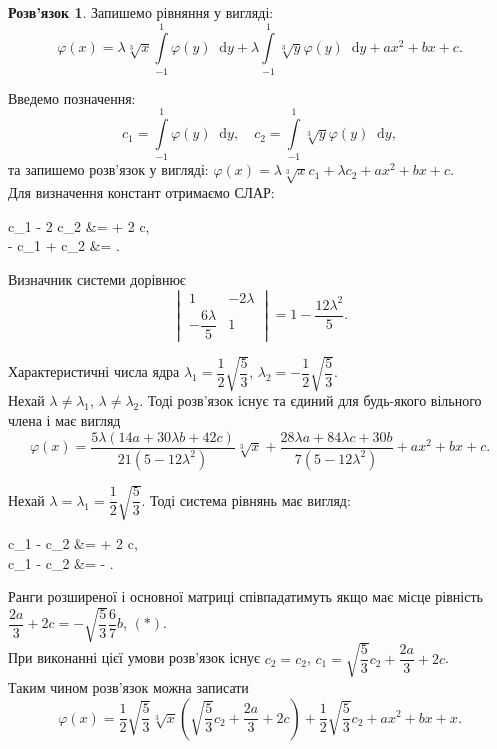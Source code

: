 \documentclass[a4paper, 12pt]{article}
\theoremstyle{definition}
\newtheorem*{solution*}{Розв'язок}
\newcommand{\Int}{\displaystyle\int\limits}
\newcommand*\diff{\mathop{}\!\mathrm{d}}
\renewcommand{\phi}{\varphi}
\newenvironment{system*}{\begin{equation*} \left\{\begin{aligned}}{\end{aligned} \right. \end{equation*}}
\begin{document}
\begin{solution*}
	Запишемо рівняння у вигляді: \[\phi(x) = \lambda \sqrt[3]{x} \Int_{-1}^1 \phi(y) \diff y + \lambda \Int_{-1}^1 \sqrt[3]{y} \phi(y) \diff y + ax^2 + bx + c. \]

	Введемо позначення: \[ c_1 = \Int_{-1}^1 \phi(y) \diff y, \quad c_2 = \Int_{-1}^1 \sqrt[3]{y} \phi(y) \diff y, \]
	та запишемо розв’язок у вигляді: $\phi(x) = \lambda \sqrt[3]{x} c_1 + \lambda c_2 + ax^2 + bx + c$. \\

	Для визначення констант отримаємо СЛАР:
	\begin{system*}
		c_1 - 2 \lambda c_2 &=  + 2 c, \\
		-  c_1 + c_2 &= .
	\end{system*}

	Визначник системи дорівнює \[\begin{vmatrix} 1 & - 2 \lambda \\ - \dfrac{6\lambda}{5} & 1 \end{vmatrix} = 1 - \dfrac{12\lambda^2}{5}.\]

	Характеристичні числа ядра $\lambda_1 = \dfrac{1}{2} \sqrt{\dfrac{5}{3}}$, $\lambda_2 = - \dfrac{1}{2} \sqrt{\dfrac{5}{3}}$. \\

	Нехай $\lambda \ne \lambda_1$, $\lambda \ne \lambda_2$. Тоді розв'язок існує та єдиний для будь-якого вільного члена і має вигляд \[ \phi(x) = \dfrac{5 \lambda (14 a + 30 \lambda b + 42 c)}{21 (5 - 12 \lambda^2)} \sqrt[3]{x} + \dfrac{28 \lambda a + 84 \lambda c + 30 b}{7(5 - 12 \lambda^2)} + ax^2 + bx + c. \]

	Нехай $\lambda = \lambda_1 = \dfrac{1}{2} \sqrt{\dfrac{5}{3}}$. Тоді система рівнянь має вигляд:
	\begin{system*}
		c_1 -  c_2 &=  + 2 c, \\
		c_1 -  c_2 &= -  \dfrac{6b}{7}.
	\end{system*}

	Ранги розширеної і основної матриці співпадатимуть якщо має місце рівність $\dfrac{2a}{3} + 2c = - \sqrt{\dfrac{5}{3}} \dfrac{6}{7} b$, $(*)$. \\

	При виконанні цієї умови розв'язок існує $c_2 = c_2$, $c_1 = \sqrt{\dfrac{5}{3}} c_2 + \dfrac{2a}{3} + 2c$. \\

	Таким чином розв'язок можна записати \[ \phi(x) = \dfrac{1}{2} \sqrt{\dfrac{5}{3}} \sqrt[3]{x} \left( \sqrt{\dfrac{5}{3}} c_2 + \dfrac{2a}{3} + 2c \right) + \dfrac{1}{2} \sqrt{\dfrac{5}{3}} c_2 + ax^2 + bx + x. \]


\end{solution*}
\end{document}
